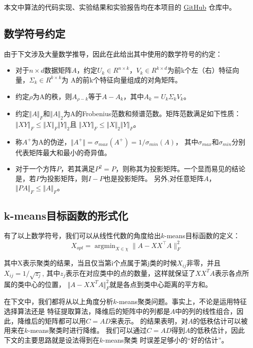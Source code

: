 \documentclass{ctexart}
\begin{document}
    本文中算法的代码实现、实验结果和实验报告均在本项目的 \href{https://github.com/fandahao17/K-means-with-dimension-reduction}{GitHub} 仓库中。

    \subsection{数学符号约定}
    \label{sec:symbols}
    由于下文涉及大量数学推导，因此在此给出其中使用的数学符号的约定：
    \begin{itemize}
        \item 对于$n \times d$数据矩阵$A$，约定$U_k \in R^{n \times k}$，$V_k \in R^{k \times d}$为前k个左（右）特征向量，$\Sigma_k \in R^{k \times k}$为
            A的前k个特征向量组成的对角矩阵。
        \item 约定$\rho$为A的秩，则$A_{\rho - k}$等于$A-A_k$，其中$A_k=U_k \Sigma_k V_k$。
        \item 约定$\Vert A \Vert_F$和$\Vert A \Vert_2$为A的Frobenius范数和频谱范数。矩阵范数满足如下性质：$\Vert XY \Vert_F \leq \Vert X \Vert_F \Vert Y \Vert_2$且
            $\Vert XY \Vert_F \leq \Vert X \Vert_2 \Vert Y \Vert_F$。
        \item 称$A^+$为A的伪逆，$\Vert A^+ \Vert = \sigma_{max}(A^+)=1/\sigma_{min}(A)$，
            其中$\sigma_{max}$和$\sigma_{min}$分别代表矩阵最大和最小的奇异值。
        \item 对于一个方阵$P$，若其满足$P^2=P$，则称其为投影矩阵。一个显而易见的结论是，若$P$为投影矩阵，则$I-P$也是投影矩阵。
        另外,对任意矩阵$A$，$\Vert PA \Vert_F \leq \Vert A \Vert_F$。
    \end{itemize}

    \subsection{k-means目标函数的形式化}
    有了以上数学符号，我们可以从线性代数的角度给出$k$-means目标函数的定义：
    \begin{equation*}
        X_{opt} = \mathop{\arg\min}_{X \in \chi} \| A - XX^{\top}A \|_{F}^2 \label{opt}
    \end{equation*}

    其中X表示聚类的结果，当且仅当第i个点属于第j类的时候$X_{ij}$非零，并且$X_{ij}= 1/\sqrt{z_{j}}$, 其中$z_{j}$表示在对应类中的点的数量，这样就保证了$XX^TA$表示各点所属的类中心的位置，
    $\Vert A-XX^TA \Vert_F^2$就是各点到类中心距离的平方和。

    在下文中，我们都将从以上角度分析$k$-means聚类问题。事实上，不论是运用特征选择算法还是
    特征提取算法，降维后的矩阵中的列都是$A$中的列的线性组合，因此，降维后的矩阵都可以用$C=AD$来表示。
    \cite{drineas1999clustering}的结果表明，对$A$的低秩估计可以被用来在$k$-means聚类时进行降维。
    我们可以通过$C=AD$得到$A$的低秩估计，因此下文的主要思路就是设法得到在$k$-means聚类
    时误差足够小的“好的估计”。
\end{document}
